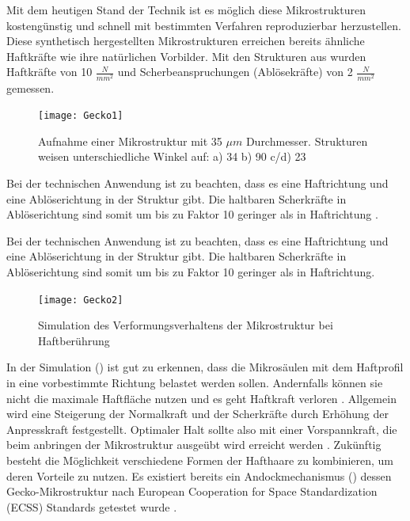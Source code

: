 	
	Mit dem heutigen Stand der Technik ist es möglich diese Mikrostrukturen kostengünstig und schnell mit bestimmten Verfahren reproduzierbar herzustellen. Diese synthetisch hergestellten Mikrostrukturen erreichen bereits ähnliche Haftkräfte wie ihre natürlichen Vorbilder. Mit den Strukturen aus  wurden Haftkräfte von 10 $\frac{N}{mm^{2}}$ und Scherbeanspruchungen (Ablösekräfte)  von 2 $\frac{N}{mm^{2}}$ gemessen.

	\begin{figure}[!h]
	\centering
		\texttt{[image: Gecko1]}
	\caption{Aufnahme einer Mikrostruktur mit 35 $\mu m$ Durchmesser. Strukturen weisen unterschiedliche Winkel auf: a) 	34\textdegree{}  b) 90\textdegree{}  c/d) 23\textdegree{} \cite{Schwerter.}}
	\label{fig:Gecko1}
\end{figure}


Bei der technischen Anwendung ist zu beachten, dass es eine Haftrichtung und eine Ablöserichtung in der Struktur gibt. Die haltbaren Scherkräfte in Ablöserichtung sind somit um bis zu Faktor 10 geringer als in Haftrichtung \cite{Schwerter.}.

	
	Bei der technischen Anwendung ist zu beachten, dass es eine Haftrichtung und eine Ablöserichtung in der Struktur gibt. Die haltbaren Scherkräfte in Ablöserichtung sind somit um bis zu Faktor 10 geringer als in Haftrichtung\cite{Schwerter.}.

\begin{figure}[!h]
	\centering
		\texttt{[image: Gecko2]}
	\caption{Simulation des Verformungsverhaltens der Mikrostruktur bei Haftberührung \cite[Abbildung 19, Seite43]{Schwerter.}}
	\label{fig:Gecko2}
\end{figure}	


In der Simulation () ist gut zu erkennen, dass die Mikrosäulen mit dem Haftprofil in eine vorbestimmte Richtung belastet werden sollen. Andernfalls können sie nicht die maximale Haftfläche nutzen und es geht Haftkraft verloren \cite{Schwerter.}. 
Allgemein wird eine Steigerung der Normalkraft und der Scherkräfte durch Erhöhung der Anpresskraft festgestellt. Optimaler Halt sollte also mit einer Vorspannkraft, die beim anbringen der Mikrostruktur ausgeübt wird erreicht werden \cite{Schwerter.}.  Zukünftig besteht die Möglichkeit verschiedene Formen der Hafthaare zu kombinieren, um deren Vorteile zu nutzen. 
Es existiert bereits ein Andockmechanismus () dessen Gecko-Mikrostruktur nach  European Cooperation for Space Standardization (ECSS) Standards getestet wurde \cite[Seite 10]{ChristopherTrentlage.2018}. 



